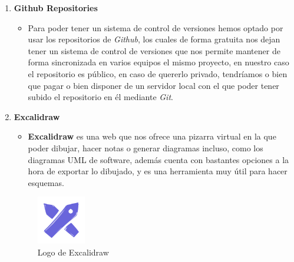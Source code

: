 \documentclass[a4paper]{article}
\begin{document}
\begin{enumerate}
\begin{itemize}
          \end{itemize}
    \item \textbf{Github Repositories}
          \begin{itemize}
              \item Para poder tener un sistema de control de versiones hemos optado por usar los repositorios de \textit{Github}, los cuales de forma gratuita nos dejan tener un sistema de control de versiones que nos permite mantener de forma sincronizada en varios equipos el mismo proyecto, en nuestro caso el repositorio es público, en caso de quererlo privado, tendríamos o bien que pagar o bien disponer de un servidor local con el que poder tener subido el repositorio en él mediante \textit{Git}.
          \end{itemize}
    \item \textbf{Excalidraw}
          \begin{itemize}
              \item \textbf{Excalidraw} es una web que nos ofrece una pizarra virtual en la que poder dibujar, hacer notas o generar diagramas incluso, como los diagramas UML de software, además cuenta con bastantes opciones a la hora de exportar lo dibujado, y es una herramienta muy útil para hacer esquemas.
          \end{itemize}
          \begin{figure}[!ht]
            \centering
            \includegraphics[width=0.2\textwidth]{Images/logoExcalidraw.png} 
            \caption{Logo de Excalidraw}
            \label{fig:excalidraw}
        \end{figure}
\end{enumerate}
\clearpage
\end{document}
